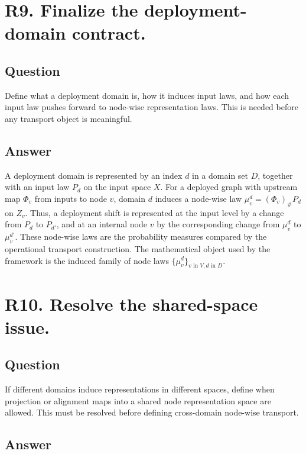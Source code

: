 \documentclass[11pt,a4paper]{article}
\begin{document}
\section*{R9. Finalize the deployment-domain contract.}

\subsection*{Question}

Define what a deployment domain is, how it induces input laws, and how each input law pushes forward to node-wise representation laws. This is needed before any transport object is meaningful.

\subsection*{Answer}

A deployment domain is represented by an index \(d\) in a domain set \(D\), together with an input law \(P_d\) on the input space \(X\). For a deployed graph with upstream map \(\Phi_v\) from inputs to node \(v\), domain \(d\) induces a node-wise law \(\mu_v^d = (\Phi_v)_\# P_d\) on \(Z_v\). Thus, a deployment shift is represented at the input level by a change from \(P_d\) to \(P_{d'}\), and at an internal node \(v\) by the corresponding change from \(\mu_v^d\) to \(\mu_v^{d'}\). These node-wise laws are the probability measures compared by the operational transport construction. The mathematical object used by the framework is the induced family of node laws \(\{\mu_v^d\}_{v \text{ in } V, d \text{ in } D}\).

\section*{R10. Resolve the shared-space issue.}

\subsection*{Question}

If different domains induce representations in different spaces, define when projection or alignment maps into a shared node representation space are allowed. This must be resolved before defining cross-domain node-wise transport.

\subsection*{Answer}
\end{document}
